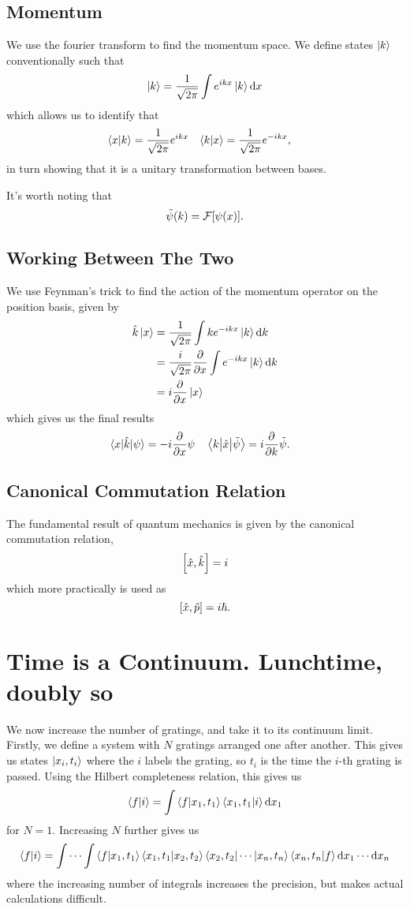 \documentclass[]{revision-notes}
\begin{document}
\subsection{Momentum}
We use the fourier transform to find the momentum space.
We define states \(\ket{k}\) conventionally such that \[ \ket{k} = \frac{1}{\sqrt{2\pi}} \int e^{ikx} \ket{k} \dd{x}\] which allows us to identify that
\begin{align*}
  \braket{x}{k} &= \frac{1}{\sqrt{2\pi}}e^{ikx} & \braket{k}{x} &= \frac{1}{\sqrt{2\pi}}e^{-ikx},
\end{align*}
in turn showing that it is a unitary transformation between bases.

It's worth noting that \[ \tilde\psi(k) = \mathcal{F}\qty[\psi(x)].\]

\subsection{Working Between The Two}
We use Feynman's trick to find the action of the momentum operator on the position basis, given by
\begin{align*}
  \hat{k} \ket{x} &= \frac{1}{\sqrt{2\pi}} \int k e^{-ikx} \ket{k} \dd{k}\\
  &= \frac{i}{\sqrt{2\pi}} \pdv{x} \int e^{-ikx} \ket{k} \dd{k}\\
  &= i \pdv{x} \ket{x}
\end{align*}
which gives us the final results
\begin{align*}
  \mel{x}{\hat{k}}{\psi} &= -i\pdv{x} \psi & \mel{k}{\hat{x}}{\tilde\psi} &= i\pdv{k}\tilde\psi.
\end{align*}

\subsection{Canonical Commutation Relation}
The fundamental result of quantum mechanics is given by the canonical commutation relation, \[ \commutator{\hat{x}}{\hat{k}} = i \] which more practically is used as \[\commutator{\hat{x}}{\hat{p}} = i\hbar. \]

\section{Time is a Continuum. Lunchtime, doubly so}
We now increase the number of gratings, and take it to its continuum limit.
Firstly, we define a system with \(N\) gratings arranged one after another.
This gives us states \( \ket{x_i, t_i} \) where the \(i\) labels the grating, so \(t_i\) is the time the \(i\)-th grating is passed.
Using the Hilbert completeness relation, this gives us \[\braket{f}{i} = \int \braket{f}{x_1,t_1} \braket{x_1,t_1}{i}\dd{x_1}\] for \(N=1\).
Increasing \(N\) further gives us \[\braket{f}{i} = \idotsint \braket{f}{x_1,t_1} \braket{x_1,t_1}{x_2,t_2} \bra{x_2, t_2}\cdots\ket{x_n,t_n}\braket{x_n, t_n}{f}\dd{x_1}\cdots\dd{x_n}\] where the increasing number of integrals increases the precision, but makes actual calculations difficult.
\end{document}
